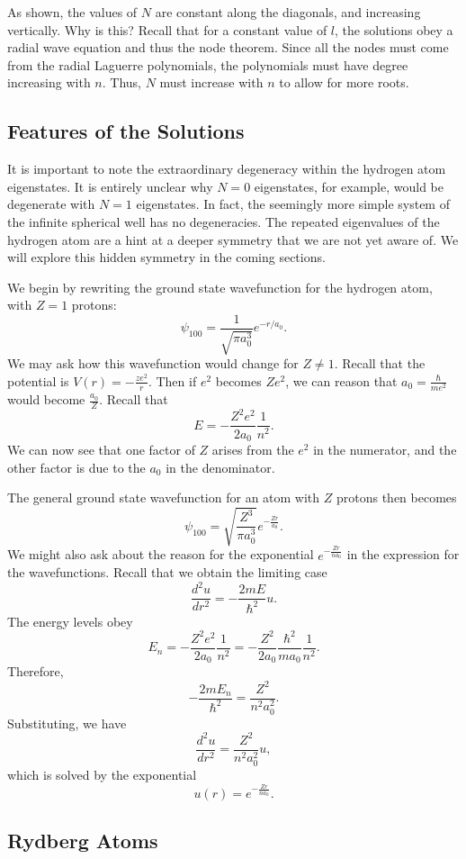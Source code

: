 As shown, the values of $N$ are constant along the diagonals, and increasing vertically. Why is this? Recall that for a constant value of $l$, the solutions obey a radial wave equation and thus the node theorem. Since all the nodes must come from the radial Laguerre polynomials, the polynomials must have degree increasing with $n$. Thus, $N$ must increase with $n$ to allow for more roots.

\subsection{Features of the Solutions}\label{features_of_the_solution}

It is important to note the extraordinary degeneracy within the hydrogen atom eigenstates. It is entirely unclear why $N=0$ eigenstates, for example, would be degenerate with $N=1$ eigenstates. In fact, the seemingly more simple system of the infinite spherical well has no degeneracies. The repeated eigenvalues of the hydrogen atom are a hint at a deeper symmetry that we are not yet aware of. We will explore this hidden symmetry in the coming sections.

We begin by rewriting the ground state wavefunction for the hydrogen atom, with $Z=1$ protons: $$\psi_{100}=\frac{1}{\sqrt{\pi a_0^3}}e^{-{r/a_0}}.$$We may ask how this wavefunction would change for $Z\neq 1$. Recall that the potential is $V(r)=-\frac{ze^2}{r}$. Then if $e^2$ becomes $Ze^2$, we can reason that $a_0=\frac{\hbar}{me^2}$ would become $\frac{a_0}{Z}$. Recall that $$E=-\frac{Z^2e^2}{2a_0}\frac{1}{n^2}.$$We can now see that one factor of $Z$ arises from the $e^2$ in the numerator, and the other factor is due to the $a_0$ in the denominator.

The general ground state wavefunction for an atom with $Z$ protons then becomes $$\psi_{100}=\sqrt{\frac{Z^3}{\pi a_0^3}}e^{-\frac{Zr}{a_0}}.$$We might also ask about the reason for the exponential $e^{-\frac{Zr}{na_0}}$ in the expression for the wavefunctions. Recall that we obtain the limiting case $$\frac{d^2u}{dr^2}=-\frac{2mE}{\hbar^2}u.$$The energy levels obey $$E_n=-\frac{Z^2e^2}{2a_0}\frac{1}{n^2}=-\frac{Z^2}{2a_0}\frac{\hbar^2}{ma_0}\frac{1}{n^2}.$$Therefore, $$-\frac{2mE_n}{\hbar^2}=\frac{Z^2}{n^2a_0^2}.$$Substituting, we have $$\frac{d^2u}{dr^2}=\frac{Z^2}{n^2a_0^2}u,$$which is solved by the exponential $$u(r)=e^{-\frac{Zr}{na_0}}.$$

\subsection{Rydberg Atoms}\label{rydberg_atoms}

